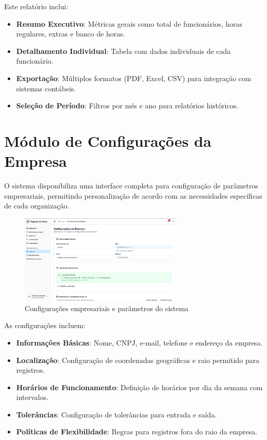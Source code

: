Este relatório inclui:

\begin{itemize}
\item \textbf{Resumo Executivo}: Métricas gerais como total de funcionários, horas regulares, extras e banco de horas.
\item \textbf{Detalhamento Individual}: Tabela com dados individuais de cada funcionário.
\item \textbf{Exportação}: Múltiplos formatos (PDF, Excel, CSV) para integração com sistemas contábeis.
\item \textbf{Seleção de Período}: Filtros por mês e ano para relatórios históricos.
\end{itemize}

\section{Módulo de Configurações da Empresa}

O sistema disponibiliza uma interface completa para configuração de parâmetros empresariais, permitindo personalização de acordo com as necessidades específicas de cada organização.

\begin{figure}[H]
\centering
\includegraphics[width=0.7\textwidth]{imagens/configuracoes-empresa.png}
\caption{Configurações empresariais e parâmetros do sistema}
\label{fig:configuracoes-empresa}
\end{figure}

As configurações incluem:

\begin{itemize}
\item \textbf{Informações Básicas}: Nome, CNPJ, e-mail, telefone e endereço da empresa.
\item \textbf{Localização}: Configuração de coordenadas geográficas e raio permitido para registros.
\item \textbf{Horários de Funcionamento}: Definição de horários por dia da semana com intervalos.
\item \textbf{Tolerâncias}: Configuração de tolerâncias para entrada e saída.
\item \textbf{Políticas de Flexibilidade}: Regras para registros fora do raio da empresa.
\end{itemize}

